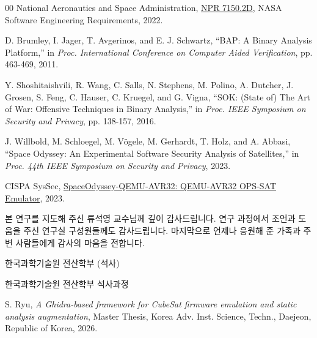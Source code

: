 \documentclass[master,korean,final]{kaist-ucs}
\begin{document}
\begin{thebibliography}{00}
 National Aeronautics and Space Administration, \underline{NPR 7150.2D}, NASA Software Engineering Requirements, 2022.

 D. Brumley, I. Jager, T. Avgerinos, and E. J. Schwartz, “BAP: A Binary Analysis Platform,” in \textit{Proc. International Conference on Computer Aided Verification}, pp. 463-469, 2011.

 Y. Shoshitaishvili, R. Wang, C. Salls, N. Stephens, M. Polino, A. Dutcher, J. Grosen, S. Feng, C. Hauser, C. Kruegel, and G. Vigna, “SOK: (State of) The Art of War: Offensive Techniques in Binary Analysis,” in \textit{Proc. IEEE Symposium on Security and Privacy}, pp. 138-157, 2016.

 J. Willbold, M. Schloegel, M. Vögele, M. Gerhardt, T. Holz, and A. Abbasi, “Space Odyssey: An Experimental Software Security Analysis of Satellites,” in \textit{Proc. 44th IEEE Symposium on Security and Privacy}, 2023.

 CISPA SysSec, \underline{SpaceOdyssey-QEMU-AVR32: QEMU-AVR32 OPS-SAT Emulator}, 2023.

\end{thebibliography}

\acknowledgment[1]
본 연구를 지도해 주신 류석영 교수님께 깊이 감사드립니다.
연구 과정에서 조언과 도움을 주신 연구실 구성원들께도 감사드립니다.
마지막으로 언제나 응원해 준 가족과 주변 사람들에게 감사의 마음을 전합니다.

\curriculumvitae[1]

    \begin{personaldata}
     \end{personaldata}

    \begin{education}
        \item[2024. 3.\ --\ 2026. 8.] 한국과학기술원 전산학부 (석사)
    \end{education}

    \begin{career}
        \item[2024. 3.\ --\ 2026. 8.] 한국과학기술원 전산학부 석사과정
    \end{career}

    \begin{publication}
        \item S. Ryu, \textit{A Ghidra-based framework for CubeSat firmware emulation and static analysis augmentation}, Master Thesis, Korea Adv. Inst. Science, Techn., Daejeon, Republic of Korea, 2026.
    \end{publication}

  \label{paperlastpagelabel}
\end{document}
